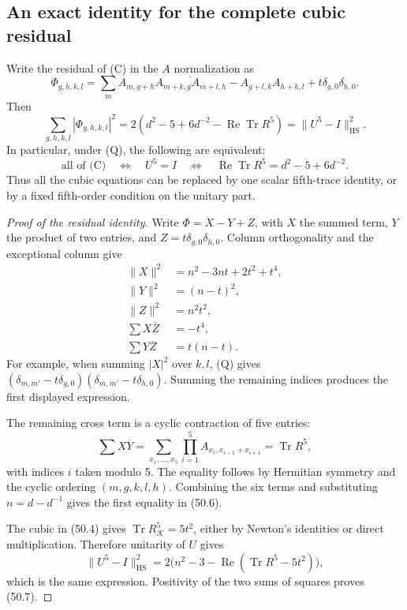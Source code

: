 \documentclass[11pt,reqno]{amsart}
\theoremstyle{plain}
\begin{document}
\subsection{An exact identity for the complete cubic residual}\label{sec:50.2}

Write the residual of (C) in the \(A\) normalization as
\[
 \Phi_{g,h,k,l}=
 \sum_m A_{m,g+h}\overline{A_{m+k,g}A_{m+l,h}}
 -A_{g+l,k}A_{h+k,l}+t\delta_{g,0}\delta_{h,0}.
\]
Then
\begin{equation*}
 \boxed{
 \sum_{g,h,k,l}|\Phi_{g,h,k,l}|^2
 =2\left(d^2-5+6d^{-2}-\operatorname{Re}\operatorname{Tr}R^5\right)
 =\|U^5-I\|_{\mathrm{HS}}^2.
 } \tag{50.6}
\end{equation*}
In particular, under (Q), the following are equivalent:
\begin{equation*}
 \boxed{
 \text{all of (C)}
 \quad\Longleftrightarrow\quad U^5=I
 \quad\Longleftrightarrow\quad
 \operatorname{Re}\operatorname{Tr}R^5=d^2-5+6d^{-2}.
 } \tag{50.7}
\end{equation*}
Thus all the cubic equations can be replaced by one scalar fifth-trace
identity, or by a fixed fifth-order condition on the unitary part.

\begin{proof}[Proof of the residual identity]
Write \(\Phi=X-Y+Z\), with
\(X\) the summed term, \(Y\) the product of two entries, and
\(Z=t\delta_{g,0}\delta_{h,0}\). Column orthogonality and the
exceptional column give
\[
\begin{aligned}
 \|X\|^2&=n^2-3nt+2t^2+t^4,\\
 \|Y\|^2&=(n-t)^2,\\
 \|Z\|^2&=n^2t^2,\\
 \sum X\overline Z&=-t^4,\\
 \sum Y\overline Z&=t(n-t).
\end{aligned}
\]
For example, when summing \(|X|^2\) over \(k,l\), (Q) gives
\((\delta_{m,m'}-t\delta_{g,0})
(\delta_{m,m'}-t\delta_{h,0})\). Summing the remaining indices
produces the first displayed expression.

The remaining cross term is a cyclic contraction of five entries:
\begin{equation*}
 \sum X\overline Y
 =\sum_{x_1,\ldots,x_5}
   \prod_{i=1}^5 A_{x_i,x_{i-1}+x_{i+1}}
 =\operatorname{Tr}R^5, \tag{50.8}
\end{equation*}
with indices \(i\) taken modulo 5. The equality follows by
Hermitian symmetry and the cyclic ordering \((m,g,k,l,h)\).
Combining the six terms and substituting \(n=d-d^{-1}\) gives
the first equality in (50.6).

The cubic in (50.4) gives
\(\operatorname{Tr}R_{\mathcal K}^5=5t^2\), either by Newton's
identities or direct multiplication. Therefore unitarity of \(U\)
gives
\[
 \|U^5-I\|_{\mathrm{HS}}^2
 =2\bigl(n^2-3-\operatorname{Re}(\operatorname{Tr}R^5-5t^2)\bigr),
\]
which is the same expression. Positivity of the two sums of squares
proves (50.7).
\end{proof}
\end{document}
